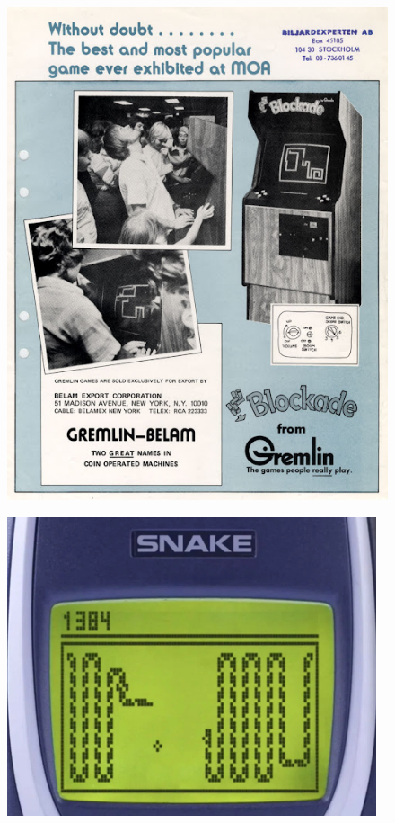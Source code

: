 \documentclass[10pt]{beamer}
\begin{document}
\begin{frame}
\begin{columns}[T]
\begin{column}{0.24\textwidth}
\begin{figure}
\includegraphics[width=1\textwidth]{blockade.jpg}
\end{figure}
\begin{figure}
\vspace{-0.8cm}\hspace{-0.6cm}
\includegraphics[width=0.97\textwidth]{snake_nokia.png}

\end{figure}
\end{column}
\end{columns}
\end{frame}
\end{document}
